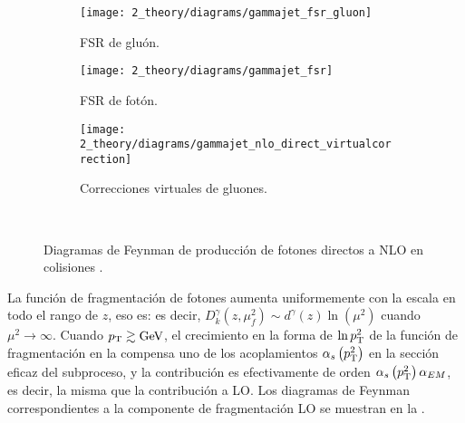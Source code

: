 \begin{figure}[ht!]
    \centering
    \begin{subfigure}[h]{0.32\linewidth}
        \centering
        \texttt{[image: 2\_theory/diagrams/gammajet\_fsr\_gluon]}
        \caption{\ac{FSR} de glu\'on.}
        \label{fig:theory:sm:prompt_photon:feynman_nlo_direct:gluon}
    \end{subfigure}
    \hfill
    \begin{subfigure}[h]{0.32\linewidth}
        \centering
        \texttt{[image: 2\_theory/diagrams/gammajet\_fsr]}
        \caption{\ac{FSR} de fot\'on.}
        \label{fig:theory:sm:prompt_photon:feynman_nlo_direct:photon}
    \end{subfigure}
    \hfill
    \begin{subfigure}[h]{0.32\linewidth}
        \centering
        \texttt{[image: 2\_theory/diagrams/gammajet\_nlo\_direct\_virtualcorrection]}
        \caption{Correcciones virtuales de gluones.}
        \label{fig:theory:sm:prompt_photon:feynman_nlo_direct:gluon_virtual}
    \end{subfigure}\\
    \caption{Diagramas de Feynman de producci\'on de fotones directos a \ac{NLO} en colisiones \pp.}
    \label{fig:theory:sm:prompt_photon:feynman_nlo_direct}
\end{figure}


La función de fragmentación de fotones aumenta uniformemente con la escala en todo el rango de \(z\), eso es: es decir, \(D_k^{\gamma} \left(z, \mu_f^2\right) \sim d^{\gamma}(z)\ln(\mu^2)\) cuando \(\mu^2 \to \infty\). Cuando \(p_{\text{T}} \gtrsim \text{GeV}\), el crecimiento en la forma de \(\ln p_{\text{T}}^2\) de la función de fragmentación en la \Eqn{\ref{eq:theory:sm:prompt_photon:fragmentation_contribution}} compensa uno de los acoplamientos \(\alpha_s \left(p_{\text{T}}^2\right)\) en la sección eficaz del subproceso, y la contribución es efectivamente de orden \(\alpha_s \left(p_{\text{T}}^2\right) \alpha_{EM}\), es decir, la misma que la contribución a \ac{LO}. Los diagramas de Feynman correspondientes a la componente de fragmentación \ac{LO} se muestran en la \Fig{\ref{fig:theory:sm:prompt_photon:feynman_lo_frag}}.



